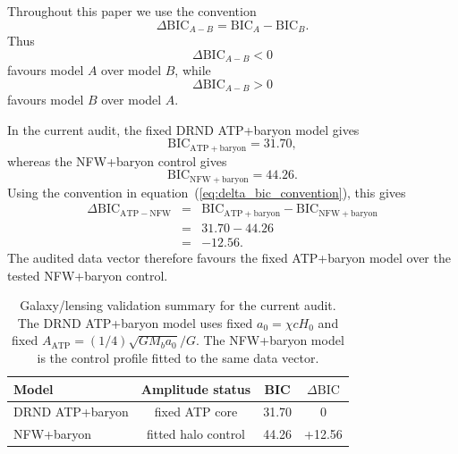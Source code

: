 \documentclass[12pt]{iopart}
\begin{document}
Throughout this paper we use the convention
\begin{equation}
\Delta\mathrm{BIC}_{A-B}
=
\mathrm{BIC}_A-\mathrm{BIC}_B.
\label{eq:delta_bic_convention}
\end{equation}
Thus
\begin{equation}
\Delta\mathrm{BIC}_{A-B}<0
\end{equation}
favours model \(A\) over model \(B\), while
\begin{equation}
\Delta\mathrm{BIC}_{A-B}>0
\end{equation}
favours model \(B\) over model \(A\).

In the current audit, the fixed DRND ATP+baryon model gives
\begin{equation}
\mathrm{BIC}_{\mathrm{ATP+baryon}}=31.70,
\end{equation}
whereas the NFW+baryon control gives
\begin{equation}
\mathrm{BIC}_{\mathrm{NFW+baryon}}=44.26.
\end{equation}
Using the convention in equation~(\ref{eq:delta_bic_convention}), this gives
\begin{eqnarray}
\Delta\mathrm{BIC}_{\mathrm{ATP-NFW}}
&=&
\mathrm{BIC}_{\mathrm{ATP+baryon}}
-
\mathrm{BIC}_{\mathrm{NFW+baryon}}
\nonumber\\
&=&
31.70-44.26
\nonumber\\
&=&
-12.56.
\label{eq:delta_bic_atp_nfw}
\end{eqnarray}
The audited data vector therefore favours the fixed ATP+baryon model over the tested NFW+baryon control.

\begin{table}[htbp]
\caption{Galaxy/lensing validation summary for the current audit. The DRND ATP+baryon model uses fixed \(a_0=\chi cH_0\) and fixed \(A_{\mathrm{ATP}}=(1/4)\sqrt{GM_ba_0}/G\). The NFW+baryon model is the control profile fitted to the same data vector.}
\label{tab:galaxy_lensing_bic}
\begin{center}
\small
\begin{tabular}{lccc}
\hline
\textbf{Model} & \textbf{Amplitude status} & \textbf{BIC} & \(\Delta\mathrm{BIC}\) \\
\hline
DRND ATP+baryon & fixed ATP core & 31.70 & 0 \\
NFW+baryon & fitted halo control & 44.26 & +12.56 \\
\hline
\end{tabular}
\end{center}
\end{table}
\end{document}
